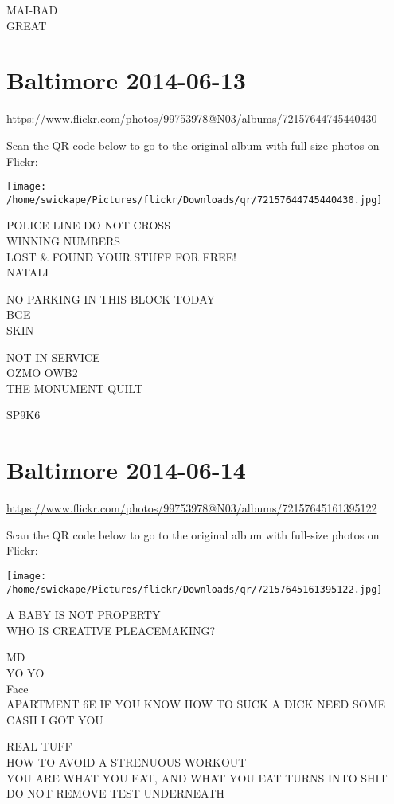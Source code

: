 \documentclass[10pt,letterpaper]{article}
\begin{document}
MAI{-}BAD\\
GREAT


\section*{Baltimore 2014-06-13}

\url{https://www.flickr.com/photos/99753978@N03/albums/72157644745440430}

Scan the QR code below to go to the original album with full-size photos on Flickr:

\texttt{[image: /home/swickape/Pictures/flickr/Downloads/qr/72157644745440430.jpg]}


POLICE LINE DO NOT CROSS\\
WINNING NUMBERS\\
LOST \& FOUND YOUR STUFF FOR FREE!\\
NATALI

NO PARKING IN THIS BLOCK TODAY\\
BGE\\
SKIN

NOT IN SERVICE\\
OZMO OWB2\\
THE MONUMENT QUILT

SP9K6


\section*{Baltimore 2014-06-14}

\url{https://www.flickr.com/photos/99753978@N03/albums/72157645161395122}

Scan the QR code below to go to the original album with full-size photos on Flickr:

\texttt{[image: /home/swickape/Pictures/flickr/Downloads/qr/72157645161395122.jpg]}


A BABY IS NOT PROPERTY\\
WHO IS CREATIVE PLEACEMAKING?

MD\\
YO YO\\
Face\\
APARTMENT 6E IF YOU KNOW HOW TO SUCK A DICK NEED SOME CASH I GOT YOU

REAL TUFF\\
HOW TO AVOID A STRENUOUS WORKOUT\\
YOU ARE WHAT YOU EAT, AND WHAT YOU EAT TURNS INTO SHIT\\
DO NOT REMOVE TEST UNDERNEATH
\end{document}

